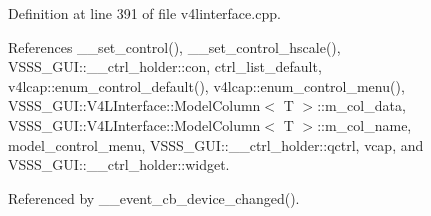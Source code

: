 Definition at line 391 of file v4linterface.\+cpp.



References \+\_\+\+\_\+set\+\_\+control(), \+\_\+\+\_\+set\+\_\+control\+\_\+hscale(), V\+S\+S\+S\+\_\+\+G\+U\+I\+::\+\_\+\+\_\+ctrl\+\_\+holder\+::con, ctrl\+\_\+list\+\_\+default, v4lcap\+::enum\+\_\+control\+\_\+default(), v4lcap\+::enum\+\_\+control\+\_\+menu(), V\+S\+S\+S\+\_\+\+G\+U\+I\+::\+V4\+L\+Interface\+::\+Model\+Column$<$ T $>$\+::m\+\_\+col\+\_\+data, V\+S\+S\+S\+\_\+\+G\+U\+I\+::\+V4\+L\+Interface\+::\+Model\+Column$<$ T $>$\+::m\+\_\+col\+\_\+name, model\+\_\+control\+\_\+menu, V\+S\+S\+S\+\_\+\+G\+U\+I\+::\+\_\+\+\_\+ctrl\+\_\+holder\+::qctrl, vcap, and V\+S\+S\+S\+\_\+\+G\+U\+I\+::\+\_\+\+\_\+ctrl\+\_\+holder\+::widget.



Referenced by \+\_\+\+\_\+event\+\_\+cb\+\_\+device\+\_\+changed().


